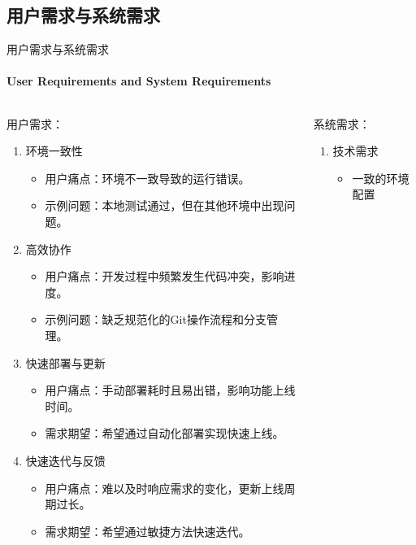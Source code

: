 \documentclass{beamer}
\begin{document}

\subsection{用户需求与系统需求}

\begin{frame}[fragile]{用户需求与系统需求}
\framesubtitle{User Requirements and System Requirements}
\begin{columns}
\begin{column}{0.7\textwidth}
用户需求：
\begin{enumerate}
\item \footnotesize 环境一致性
\begin{itemize}
\item \footnotesize 用户痛点：环境不一致导致的运行错误。
\item \footnotesize 示例问题：本地测试通过，但在其他环境中出现问题。
\end{itemize}
\item \footnotesize 高效协作
\begin{itemize}
\item \footnotesize 用户痛点：开发过程中频繁发生代码冲突，影响进度。
\item \footnotesize 示例问题：缺乏规范化的Git操作流程和分支管理。
\end{itemize}
\item \footnotesize 快速部署与更新
\begin{itemize}
\item \footnotesize 用户痛点：手动部署耗时且易出错，影响功能上线时间。
\item \footnotesize 需求期望：希望通过自动化部署实现快速上线。
\end{itemize}
\item \footnotesize 快速迭代与反馈
\begin{itemize}
\item \footnotesize 用户痛点：难以及时响应需求的变化，更新上线周期过长。
\item \footnotesize 需求期望：希望通过敏捷方法快速迭代。
\end{itemize}
\end{enumerate}
\end{column}
\begin{column}{0.3\textwidth}
系统需求：
\begin{enumerate}
\item \footnotesize 技术需求
\begin{itemize}
\item \footnotesize 一致的环境配置

\end{itemize}
\end{enumerate}
\end{column}
\end{columns}
\end{frame}
\end{document}

